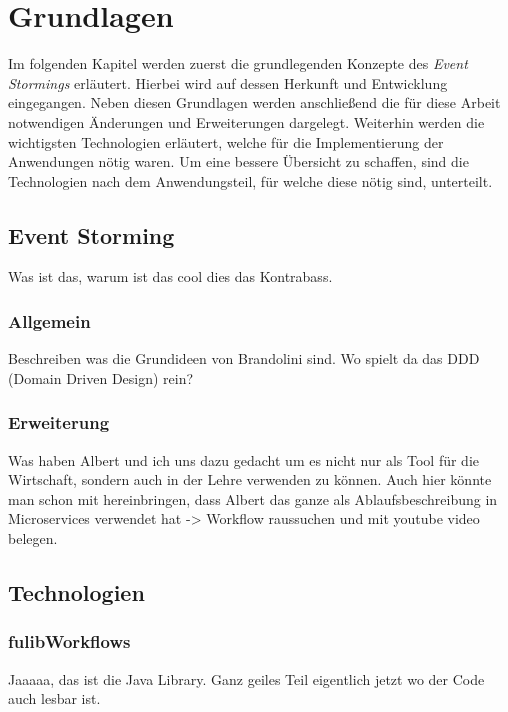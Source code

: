 \chapter{Grundlagen}\label{ch:technologien}
Im folgenden Kapitel werden zuerst die grundlegenden Konzepte des \textit{Event Stormings} erläutert.
Hierbei wird auf dessen Herkunft und Entwicklung eingegangen.
Neben diesen Grundlagen werden anschließend die für diese Arbeit notwendigen Änderungen und Erweiterungen dargelegt.
Weiterhin werden die wichtigsten Technologien erläutert, welche für die Implementierung der Anwendungen nötig waren.
Um eine bessere Übersicht zu schaffen, sind die Technologien nach dem Anwendungsteil, für welche diese nötig sind, unterteilt.

\section{Event Storming}\label{sec:event-storming}
\todo
Was ist das, warum ist das cool dies das Kontrabass.\cite*{introES}

\subsection{Allgemein}\label{subsec:allgemein}
\todo
Beschreiben was die Grundideen von Brandolini sind.
Wo spielt da das DDD (Domain Driven Design) rein?

\subsection{Erweiterung}\label{subsec:erweiterung}
\todo
Was haben Albert und ich uns dazu gedacht um es nicht nur als Tool für die Wirtschaft, sondern
auch in der Lehre verwenden zu können.
Auch hier könnte man schon mit hereinbringen, dass Albert das ganze als Ablaufsbeschreibung in
Microservices verwendet hat -> Workflow raussuchen und mit youtube video belegen.

\section{Technologien}\label{sec:technologien}
\todo

\subsection{fulibWorkflows}\label{subsec:fulibworkflows}
\todo
Jaaaaa, das ist die Java Library.
Ganz geiles Teil eigentlich jetzt wo der Code auch lesbar ist.

